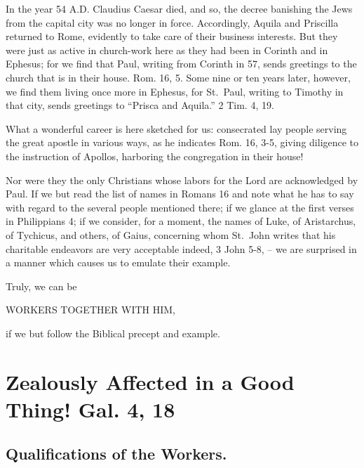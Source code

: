 \documentclass[
]{book}
\begin{document}
In the year 54 A.D. Claudius Caesar died, and so, the decree banishing the Jews from the capital city was no longer in force. Accordingly, Aquila and Priscilla returned to Rome, evidently to take care of their business interests. But they were just as active in church-work here as they had been in Corinth and in Ephesus; for we find that Paul, writing from Corinth in 57, sends greetings to the church that is in their house. Rom. 16, 5. Some nine or ten years later, however, we find them living once more in Ephesus, for St.~Paul, writing to Timothy in that city, sends greetings to ``Prisca and Aquila.'' 2 Tim. 4, 19.

What a wonderful career is here sketched for us: consecrated lay people serving the great apostle in various ways, as he indicates Rom. 16, 3-5, giving diligence to the instruction of Apollos, harboring the congregation in their house!

Nor were they the only Christians whose labors for the Lord are acknowledged by Paul. If we but read the list of names in Romans 16 and note what he has to say with regard to the several people mentioned there; if we glance at the first verses in Philippians 4; if we consider, for a moment, the names of Luke, of Aristarchus, of Tychicus, and others, of Gaius, concerning whom St.~John writes that his charitable endeavors are very acceptable indeed, 3 John 5-8, -- we are surprised in a manner which causes us to emulate their example.

Truly, we can be

\begin{center} WORKERS TOGETHER WITH HIM, \end{center}

if we but follow the Biblical precept and example.

\hypertarget{zealously-affected-in-a-good-thing-gal.-4-18}{%
\chapter{Zealously Affected in a Good Thing! Gal. 4, 18}\label{zealously-affected-in-a-good-thing-gal.-4-18}}

\hypertarget{qualifications-of-the-workers.}{%
\section*{Qualifications of the Workers.}\label{qualifications-of-the-workers.}}
\end{document}
